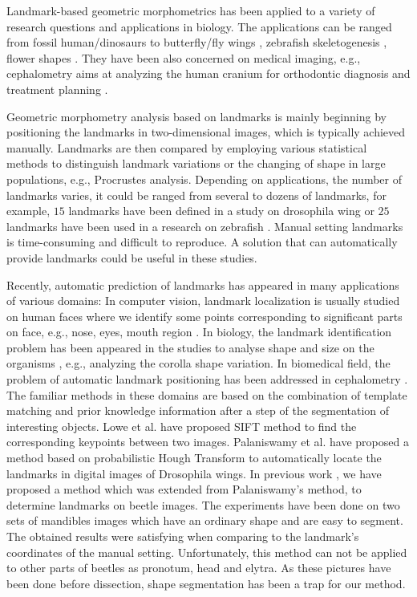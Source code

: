 \documentclass[review]{elsarticle}
\begin{document}
Landmark-based geometric morphometrics has been applied to a variety of research questions and applications in biology. The applications can be ranged from fossil human/dinosaurs \cite{rosas2015geometric, fearon2015morphometric} to butterfly/fly wings \cite{chazot2016morpho}, zebrafish skeletogenesis \cite{aceto2015zebrafish}, flower shapes \cite{van2010three}. They have been also concerned on medical imaging, e.g., cephalometry aims at analyzing the human cranium for orthodontic diagnosis and treatment planning \cite{lindner2016fully, grau2001automatic}. 

Geometric morphometry analysis based on landmarks is mainly beginning by positioning the landmarks in two-dimensional images, which is typically achieved manually. Landmarks are then compared by employing various statistical methods to distinguish landmark variations or the changing of shape in large populations, e.g., Procrustes analysis. Depending on applications, the number of landmarks varies, it could be ranged from several to dozens of landmarks, for example, $15$ landmarks have been defined in a study on drosophila wing \cite{palaniswamy2010automatic} or $25$ landmarks have been used in a research on zebrafish \cite{aceto2015zebrafish, vandaele2018landmark}. Manual setting landmarks is time-consuming and difficult to reproduce. A solution that can automatically provide landmarks could be useful in these studies.

Recently, automatic prediction of landmarks has appeared in many applications of various domains: In computer vision, landmark localization is usually studied on human faces where we identify some points corresponding to significant parts on face, e.g., nose, eyes, mouth region \cite{burgos2013robust, yang2013sieving}. In biology, the landmark identification problem has been appeared in the studies to analyse shape and size on the organisms \cite{palaniswamy2010automatic, savriama2018step}, e.g., analyzing the corolla shape variation. In biomedical field, the problem of automatic landmark positioning has been addressed in cephalometry \cite{grau2001automatic, mohseni2007automatic}. The familiar methods in these domains are based on the combination of template matching and prior knowledge information after a step of the segmentation of interesting objects. Lowe et al. \cite{lowe2004distinctive} have proposed SIFT method to find the corresponding keypoints between two images. Palaniswamy et al. \cite{palaniswamy2010automatic} have proposed a method based on probabilistic Hough Transform to automatically locate the landmarks in digital images of Drosophila wings. In previous work \cite{le2017maelab}, we have proposed a method which was extended from Palaniswamy's method, to determine landmarks on beetle images. The experiments have been done on two sets of mandibles images which have an ordinary shape and are easy to segment. The obtained results were satisfying when comparing to the landmark's coordinates of the manual setting. Unfortunately, this method can not be applied to other parts of beetles as pronotum, head and elytra. As these pictures have been done before dissection, shape segmentation has been a trap for our method.
\end{document}
